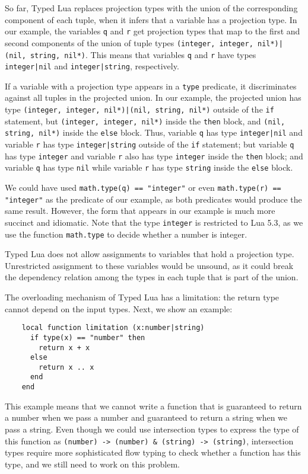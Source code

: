 So far, Typed Lua replaces projection types with the union of the
corresponding component of each tuple, when it infers that a variable
has a projection type.
In our example, the variables \texttt{q} and \texttt{r} get projection
types that map to the first and second components of the union of
tuple types \texttt{(integer, integer, nil*)|(nil, string, nil*)}.
This means that variables \texttt{q} and \texttt{r} have types
\texttt{integer|nil} and \texttt{integer|string}, respectively.

If a variable with a projection type appears in a \texttt{type} predicate,
it discriminates against all tuples in the projected union.
In our example, the projected union has type
\texttt{(integer, integer, nil*)|(nil, string, nil*)} outside of the
\texttt{if} statement,
but \texttt{(integer, integer, nil*)} inside the \texttt{then} block,
and \texttt{(nil, string, nil*)} inside the \texttt{else} block.
Thus, variable \texttt{q} has type \texttt{integer|nil} and variable
\texttt{r} has type \texttt{integer|string} outside of the
\texttt{if} statement;
but variable \texttt{q} has type \texttt{integer} and variable \texttt{r} also
has type \texttt{integer} inside the \texttt{then} block;
and variable \texttt{q} has type \texttt{nil} while variable \texttt{r}
has type \texttt{string} inside the \texttt{else} block.

We could have used \texttt{math.type(q) == "integer"} or
even \texttt{math.type(r) == "integer"} as the predicate of our example,
as both predicates would produce the same result.
However, the form that appears in our example is much more succinct and idiomatic.
Note that the type \texttt{integer} is restricted to Lua 5.3,
as we use the function \texttt{math.type} to decide whether a number is integer.

Typed Lua does not allow assignments to variables that hold a projection type.
Unrestricted assignment to these variables would be unsound,
as it could break the dependency relation among the types in each tuple
that is part of the union.

The overloading mechanism of Typed Lua has a limitation:
the return type cannot depend on the input types.
Next, we show an example:
\begin{verbatim}
    local function limitation (x:number|string)
      if type(x) == "number" then
        return x + x
      else
        return x .. x
      end
    end
\end{verbatim}

This example means that we cannot write a function that is
guaranteed to return a number when we pass a number and
guaranteed to return a string when we pass a string.
Even though we could use intersection types to express the type
of this function as
\texttt{(number) -> (number) \string& (string) -> (string)},
intersection types require more sophisticated flow typing to
check whether a function has this type,
and we still need to work on this problem.

